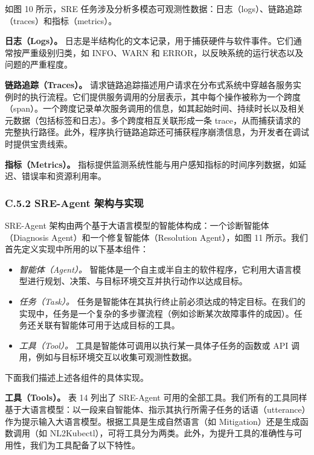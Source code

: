 \documentclass[10pt,UTF8,fontset=fandol]{ctexart}
\begin{document}
如图 10 所示，SRE 任务涉及分析多模态可观测性数据：日志（logs）、链路追踪（traces）和指标（metrics）。

\textbf{日志（Logs）。} 日志是半结构化的文本记录，用于捕获硬件与软件事件。它们通常按严重级别归类，如 INFO、WARN 和 ERROR，以反映系统的运行状态以及问题的严重程度。

\textbf{链路追踪（Traces）。} 请求链路追踪描述用户请求在分布式系统中穿越各服务实例时的执行流程。它们提供服务调用的分层表示，其中每个操作被称为一个跨度（span）。一个跨度记录单次服务调用的信息，如其起始时间、持续时长以及相关元数据（包括标签和日志）。多个跨度相互关联形成一条 trace，从而捕获请求的完整执行路径。此外，程序执行链路追踪还可捕获程序崩溃信息，为开发者在调试时提供宝贵线索。

\textbf{指标（Metrics）。} 指标提供监测系统性能与用户感知指标的时间序列数据，如延迟、错误率和资源利用率。

\subsubsection{C.5.2 SRE-Agent 架构与实现}

SRE-Agent 架构由两个基于大语言模型的智能体构成：一个诊断智能体（Diagnosis Agent）和一个修复智能体（Resolution Agent），如图 11 所示。我们首先定义实现中所用的以下基本组件：

\begin{itemize}
\item \emph{智能体（Agent）。} 智能体是一个自主或半自主的软件程序，它利用大语言模型进行规划、决策、与目标环境交互并执行动作以达成目标。
\item \emph{任务（Task）。} 任务是智能体在其执行终止前必须达成的特定目标。在我们的实现中，任务是一个复杂的多步骤流程（例如诊断某次故障事件的成因）。任务还关联有智能体可用于达成目标的工具。
\item \emph{工具（Tool）。} 工具是智能体可调用以执行某一具体子任务的函数或 API 调用，例如与目标环境交互以收集可观测性数据。
\end{itemize}

下面我们描述上述各组件的具体实现。

\textbf{工具（Tools）。} 表 14 列出了 SRE-Agent 可用的全部工具。我们所有的工具同样基于大语言模型：以一段来自智能体、指示其执行所需子任务的话语（utterance）作为提示输入大语言模型。根据工具是生成自然语言（如 Mitigation）还是生成函数调用（如 NL2Kubectl），可将工具分为两类。此外，为提升工具的准确性与可用性，我们为工具配备了以下特性。
\end{document}
